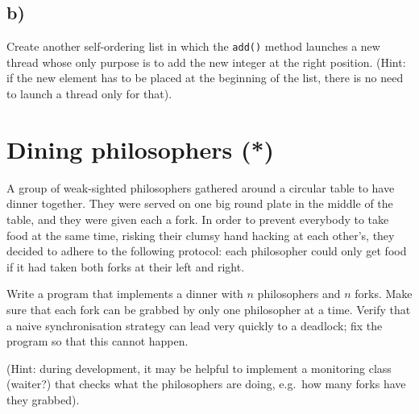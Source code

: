 \documentclass{article}
\begin{document}
\subsection{b)}
\label{sec:b}

Create another self-ordering list in which the \verb+add()+ method
launches a new thread whose only purpose is to add the new integer at
the right position. (Hint: if the new element has to be placed at the
beginning of the list, there is no need to launch a thread only for
that). 


\section{Dining philosophers (*)}
\label{sec:dining-philosophers}

A group of weak-sighted philosophers gathered around a circular table
to have dinner together. They were served on one big round plate in
the middle of the table, and they were given each a fork. In order to
prevent everybody to take food at the same time, risking their clumsy
hand hacking at each other's, they decided to adhere to the following
protocol: each philosopher could only get food if it had taken both
forks at their left and right. 

Write a program that implements a dinner with $n$ philosophers and $n$
forks. Make sure that each fork can be grabbed by only one philosopher
at a time. Verify that a naive synchronisation strategy can lead very
quickly to a deadlock; fix the program so that this cannot happen. 

(Hint: during development, it may be helpful to implement a monitoring
class (waiter?)  that checks what the philosophers are doing, e.g.~how
many forks have they grabbed).
\end{document}
